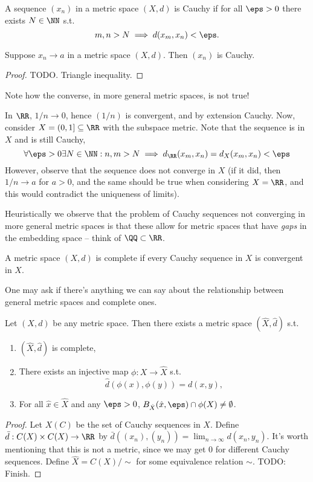 \begin{definition}
  A sequence $(x_n)$ in a metric space $(X,d)$ is Cauchy if for all $\eps>0$
  there exists $N\in\NN$ s.t. 
  \[m,n>N \implies d(x_m,x_n)<\eps.\]
  \label{<+label+>}
\end{definition}

\begin{proposition}
  Suppose $x_n\to a$ in a metric space $(X,d)$. Then $(x_n)$ is Cauchy.
  \label{<+label+>}
\end{proposition}
\begin{proof}
  TODO. Triangle inequality.
\end{proof}
\begin{remark}
  Note how the converse, in more general metric spaces, is not true!
\end{remark}
\begin{example}
  In $\RR$, $1/n\to 0$, hence $(1/n)$ is convergent, and by extension Cauchy.
  Now, consider $X=(0,1]\subseteq\RR$ with the subspace metric. Note that the
  sequence is in $X$ and is still Cauchy,
  \[\forall \eps>0 \exists N\in\NN : n,m>N \implies
  d_{\RR}(x_m,x_n)=d_X(x_m,x_n)<\eps\]
  However, observe that the sequence does not converge in $X$ (if it did, then
  $1/n\to a$ for $a>0$, and the same should be true when considering $X=\RR$,
  and this would contradict the uniqueness of limits).
\end{example}
Heuristically we observe that the problem of Cauchy sequences not converging in
more general metric spaces is that these allow for metric spaces that have
\emph{gaps} in the embedding space -- think of $\QQ\subset\RR$.
\begin{definition}
  A metric space $(X,d)$ is complete if every Cauchy sequence in $X$ is
  convergent in $X$.
  \label{def:completnessMetricSpace}
\end{definition}
One may ask if there's anything we can say about the relationship between
general metric spaces and complete ones.
\begin{theorem} 
  Let $(X,d)$ be any metric space. Then there exists a metric space
  $(\hat{X},\hat{d})$ s.t. 
  \begin{enumerate}
    \item $(\hat{X}, \hat{d})$ is complete,
    \item There exists an injective map $\phi:X\to\hat{X}$ s.t.
      \[\hat{d}(\phi(x),\phi(y))=d(x,y),\]
    \item For all $\hat{x}\in \hat{X}$ and any $\eps>0$, $B_{\hat{X}}
      (\hat{x},\eps)\cap \phi(X) \neq \emptyset$.
  \end{enumerate}
  \label{<+label+>}
\end{theorem}
\begin{proof}
  Let $X(C)$ be the set of Cauchy sequences in $X$. Define $\bar{d}:C(X)\times
  C(X) \to \RR$ by $\bar{d}( (x_n),(y_n)) = \lim_{n\to\infty} d(x_n,y_n)$. It's
  worth mentioning that this is not a metric, since we may get $0$ for different
  Cauchy sequences. Define $\hat{X} = C(X)/\sim$ for some equivalence relation
  $\sim$. TODO: Finish.
\end{proof}
